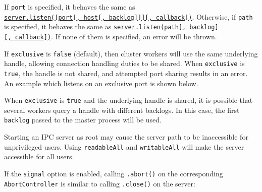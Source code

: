If \texttt{port} is specified, it behaves the same as
\hyperref[serverlistenport-host-backlog-callback]{\texttt{server.listen({[}port{[},\ host{[},\ backlog{]}{]}{]}{[},\ callback{]})}}.
Otherwise, if \texttt{path} is specified, it behaves the same as
\hyperref[serverlistenpath-backlog-callback]{\texttt{server.listen(path{[},\ backlog{]}{[},\ callback{]})}}.
If none of them is specified, an error will be thrown.

If \texttt{exclusive} is \texttt{false} (default), then cluster workers
will use the same underlying handle, allowing connection handling duties
to be shared. When \texttt{exclusive} is \texttt{true}, the handle is
not shared, and attempted port sharing results in an error. An example
which listens on an exclusive port is shown below.

\begin{Shaded}
\begin{Highlighting}[]
\NormalTok{(\{}
  \OperatorTok{:} \OperatorTok{,}
  \OperatorTok{:} \OperatorTok{,}
  \OperatorTok{:} \OperatorTok{,}
\NormalTok{\})}\OperatorTok{;}
\end{Highlighting}
\end{Shaded}

When \texttt{exclusive} is \texttt{true} and the underlying handle is
shared, it is possible that several workers query a handle with
different backlogs. In this case, the first \texttt{backlog} passed to
the master process will be used.

Starting an IPC server as root may cause the server path to be
inaccessible for unprivileged users. Using \texttt{readableAll} and
\texttt{writableAll} will make the server accessible for all users.

If the \texttt{signal} option is enabled, calling \texttt{.abort()} on
the corresponding \texttt{AbortController} is similar to calling
\texttt{.close()} on the server:

\begin{Shaded}
\begin{Highlighting}[]
\OperatorTok{=}  \NormalTok{()}\OperatorTok{;}
\NormalTok{(\{}
  \OperatorTok{:} \OperatorTok{,}
  \OperatorTok{:} \OperatorTok{,}
  \OperatorTok{:}\OperatorTok{,}
\NormalTok{\})}\OperatorTok{;}
\NormalTok{()}\OperatorTok{;}
\end{Highlighting}
\end{Shaded}

